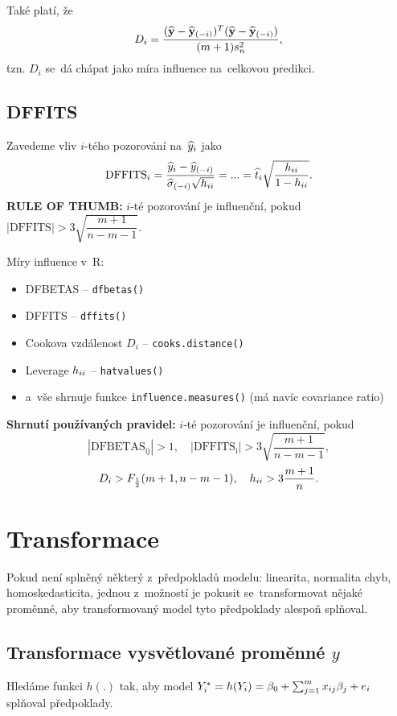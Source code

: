 \begin{remark}
	Také platí, že
	 $$ D_i = \frac{(\widehat{\mathbf{y}}-\widehat{\mathbf{y}}_{(-i)})^T(\widehat{\mathbf{y}}-\widehat{\mathbf{y}}_{(-i)})}{(m+1)s_n^2},$$
	tzn. $D_i$ se~dá chápat jako míra influence na~celkovou predikci.
\end{remark}

\subsection{DFFITS}
Zavedeme vliv $i$-tého pozorování na~$\widehat{y}_i$ jako
 $$ \mathrm{DFFITS}_i = \frac{\widehat{y}_i-\widehat{y}_{(-i)}}{\widehat{{\sigma}}_{(-i)}\sqrt{h_{ii}}} = ... = \widehat{t}_i\sqrt{\frac{h_{ii}}{1-h_{ii}}}. $$
\textbf{RULE OF THUMB:} $i$-té pozorování je influenční, pokud $|\mathrm{DFFITS}|>3\sqrt{\dfrac{m+1}{n-m-1}}$.

\begin{remark}Míry influence v~R:
\begin{itemize}
	\item DFBETAS -- \verb|dfbetas()|
	\item DFFITS -- \verb|dffits()|
	\item Cookova vzdálenost $D_i$ -- \verb|cooks.distance()|
	\item Leverage $h_{ii}$ -- \verb|hatvalues()|
	\item a~vše shrnuje funkce \verb|influence.measures()| (má navíc covariance ratio)
\end{itemize}
\end{remark}

\textbf{Shrnutí používaných pravidel:} $i$-té pozorování je influenční, pokud
$$|\mathrm{DFBETAS_{ij}} | > 1, \quad |\mathrm{DFFITS_i}| > 3 \sqrt{\frac{m+1}{n-m-1}},$$
$$ D_i > F_{\frac{1}{2}}(m+1,n-m-1), \quad h_{ii} > 3 \frac{m+1}{n}.$$


\section{Transformace}

Pokud není splněný některý z~předpokladů modelu: linearita, normalita chyb, homoskedasticita, jednou z~možností je pokusit se~transformovat nějaké proměnné, aby transformovaný model tyto předpoklady alespoň  splňoval.

\subsection{Transformace vysvětlované proměnné $y$ }

Hledáme funkci $h(.)$ tak, aby model $Y_i^* = h(Y_i) = \beta_0 + \sum_{j=1}^{m} x_{ij} \beta_j + e_i$ splňoval předpoklady.

